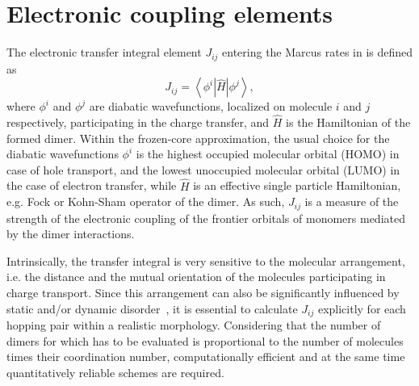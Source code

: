 \section{Electronic coupling elements}
\label{sec:transfer_integrals}

The electronic transfer integral element $J_{ij}$ entering the Marcus rates in  is defined as
\begin{equation}
   J_{ij} = \left\langle \phi^i \left\vert \hat{H} \right\vert \phi^j \right\rangle ,
\label{equ:TI}
\end{equation}
where $\phi^i$ and $\phi^j$ are diabatic wavefunctions, localized on molecule $i$ and $j$ respectively, participating in the charge transfer, and $\hat{H}$ is the Hamiltonian of the formed dimer. Within the frozen-core approximation, the usual choice for the diabatic wavefunctions $\phi^i$ is the highest occupied molecular orbital (HOMO) in case of hole transport, and the lowest unoccupied molecular orbital (LUMO) in the case of electron transfer, while $\hat{H}$ is an effective single particle Hamiltonian, e.g. Fock or Kohn-Sham operator of the dimer. As such, $J_{ij}$ is a measure of the strength of the electronic coupling of the frontier orbitals of monomers mediated by the dimer interactions. 

Intrinsically, the transfer integral is very sensitive to the molecular arrangement, i.e. the distance and the mutual orientation of the molecules participating in charge transport. Since this arrangement can also be significantly influenced by static and/or dynamic disorder~\cite{baessler_charge_1993,troisi_charge-transport_2006,troisi_charge_2009,mcmahon_organic_2010,vehoff_charge_2010},
it is essential to calculate $J_{ij}$ explicitly for each hopping pair within a realistic morphology. Considering that the number of dimers for which  has to be evaluated is proportional to the number of molecules times their coordination number, computationally efficient and at the same time quantitatively reliable schemes are required.



